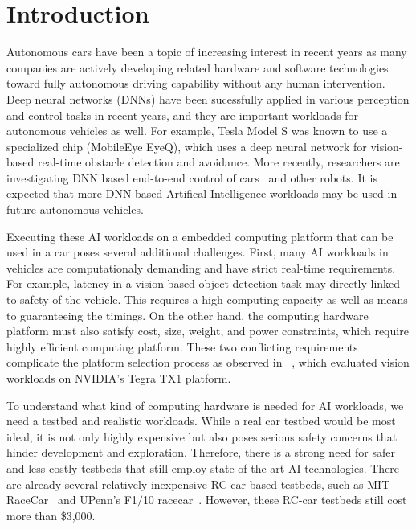 \section{Introduction} \label{sec:intro}

%
%
Autonomous cars have been a topic of increasing interest in recent
years as many companies are actively developing related hardware
and software technologies toward fully autonomous driving capability without
any human intervention. Deep neural networks (DNNs) have been
sucessfully applied in various perception and control tasks in 
recent years, and they are important workloads for autonomous vehicles
as well. For example, Tesla Model S was known to use a specialized
chip (MobileEye EyeQ), which uses a deep neural network for vision-based
real-time obstacle detection and avoidance. More recently, researchers
are investigating DNN based end-to-end control of
cars~\cite{Bojarski2016} and other robots. It is expected that more
DNN based Artifical Intelligence workloads may be used in future
autonomous vehicles.

Executing these AI workloads on a embedded computing platform that can
be used in a car poses several additional challenges. First, many AI
workloads in vehicles are computationaly demanding and have strict
real-time requirements. For example, latency in a vision-based object
detection task may directly linked to safety of the vehicle. This
requires a high computing capacity as well as means to guaranteeing
the timings. On the other hand, the computing hardware platform must
also satisfy cost, size, weight, and power constraints, which require
highly efficient computing platform. These two conflicting
requirements  complicate the platform selection process as observed in
~\cite{Otterness2017}, which evaluated vision workloads on
NVIDIA's Tegra TX1 platform.

To understand what kind of computing hardware is needed for AI
workloads, we need a testbed and realistic workloads. While a real car
testbed would be most ideal, it is not only highly expensive but also
poses serious safety concerns that hinder development and exploration.
Therefore, there is a strong need for safer and less costly testbeds
that still employ state-of-the-art AI technologies. There are already
several relatively inexpensive RC-car based testbeds, such as MIT
RaceCar~\cite{shin2017project} and UPenn's F1$/$10 racecar~\cite{upennf1tenth}.
However, these RC-car testbeds still cost more than \$3,000.

